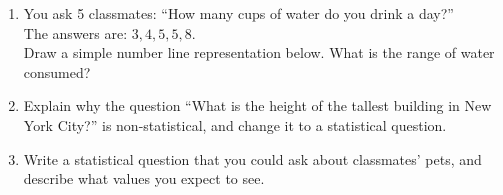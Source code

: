 \documentclass[12pt, letterpaper, fleqn]{article}
\begin{document}
\begin{enumerate}[itemsep=3cm, leftmargin=0.6cm]
\item You ask 5 classmates: ``How many cups of water do you drink a day?'' \\
The answers are: $3, 4, 5, 5, 8$. \\
Draw a simple number line representation below. What is the range of water consumed?
\vspace{1cm}

\item Explain why the question ``What is the height of the tallest building in New York City?'' is non-statistical, and change it to a statistical question.
\vspace{1cm}

\item Write a statistical question that you could ask about classmates' pets, and describe what values you expect to see.
\end{enumerate}
\end{document}
